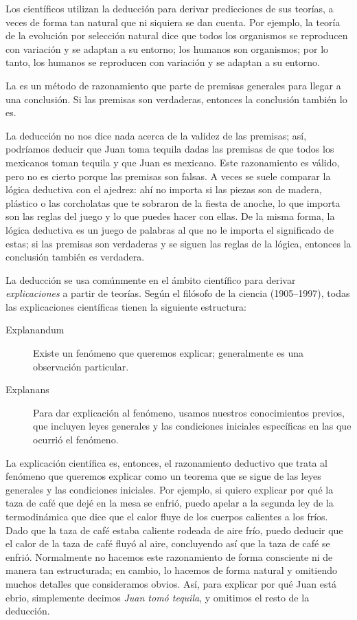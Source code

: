 Los científicos utilizan la deducción para derivar predicciones de sus teorías,
a veces de forma tan natural que ni siquiera se dan cuenta.
Por ejemplo, la teoría de la evolución por selección natural dice que todos los
organismos se reproducen con variación y se adaptan a su entorno; los humanos
son organismos; por lo tanto, los humanos se reproducen con variación y se
adaptan a su entorno.

\begin{remember}
    \label{rem:deduccion}
    La  es un método de razonamiento que parte de
    premisas generales para llegar a una conclusión.
    Si las premisas son verdaderas, entonces la conclusión también lo es.
\end{remember}

La deducción no nos dice nada acerca de la validez de las premisas; así,
podríamos deducir que Juan toma tequila dadas las premisas de que todos los
mexicanos toman tequila y que Juan es mexicano.
Este razonamiento es válido, pero no es cierto porque las premisas son falsas.
A veces se suele comparar la lógica deductiva con el ajedrez: ahí no importa si
las piezas son de madera, plástico o las corcholatas que te sobraron de la
fiesta de anoche, lo que importa son las reglas del juego y lo que puedes
hacer con ellas.
De la misma forma, la lógica deductiva es un juego de palabras al que no le
importa el significado de estas; si las premisas son verdaderas y se siguen las
reglas de la lógica, entonces la conclusión también es verdadera.

La deducción se usa comúnmente en el ámbito científico para derivar
\emph{explicaciones} a partir de teorías.
Según el filósofo de la ciencia  (1905--1997),
todas las explicaciones científicas tienen la siguiente estructura:
\begin{description}
    \item[Explanandum] Existe un fenómeno que queremos explicar; generalmente
        es una observación particular.
    \item[Explanans] Para dar explicación al fenómeno, usamos nuestros
        conocimientos previos, que incluyen leyes generales y las condiciones
        iniciales específicas en las que ocurrió el fenómeno.
\end{description}

La explicación científica es, entonces, el razonamiento deductivo que trata al
fenómeno que queremos explicar como un teorema que se sigue de las leyes
generales y las condiciones iniciales.
Por ejemplo, si quiero explicar por qué la taza de café que dejé en la mesa se
enfrió, puedo apelar a la segunda ley de la termodinámica que dice que el calor
fluye de los cuerpos calientes a los fríos.
Dado que la taza de café estaba caliente rodeada de aire frío, puedo deducir que
el calor de la taza de café fluyó al aire, concluyendo así que la taza de café
se enfrió.
Normalmente no hacemos este razonamiento de forma consciente ni de manera tan
estructurada; en cambio, lo hacemos de forma natural y omitiendo muchos detalles
que consideramos obvios.
Así, para explicar por qué Juan está ebrio, simplemente decimos \emph{Juan tomó
    tequila}, y omitimos el resto de la deducción.

